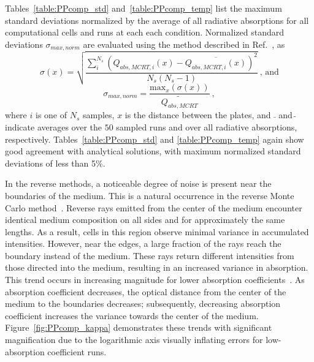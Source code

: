Tables~\ref{table:PPcomp_std} and~\ref{table:PPcomp_temp} list the maximum standard deviations normalized by the average of all radiative absorptions for all computational cells and runs at each each condition. Normalized standard deviations $\sigma_{max,norm}$ are evaluated using the method described in Ref.~\cite{Modest2022ChapterExchange}, as 
\begin{equation}
    \sigma(x) = \sqrt{\frac{\sum_i^{N_s}{(Q_{abs,MCRT,i}(x)-\overline{Q_{abs,MCRT,i}(x)})^2}}{N_s(N_s-1)}}~\text{, and}
    \label{eq:StandardDeviation}
\end{equation}
\begin{equation}
    \sigma_{max,norm} = \frac{\text{max}_x(\sigma(x))}{\widetilde{Q_{abs,MCRT}}}~,
    \label{eq:StandardDeviationMax}
\end{equation}
where $i$ is one of $N_s$ samples, $x$ is the distance between the plates, and $\bar{~}$ and $\widetilde{~}$ indicate averages over the $50$ sampled runs and over all radiative absorptions, respectively. 
Tables~\ref{table:PPcomp_std} and \ref{table:PPcomp_temp} again show good agreement with analytical solutions, with maximum normalized standard deviations of less than 5\%.

In the reverse methods, a noticeable degree of noise is present near the boundaries of the medium. This is a natural occurrence in the reverse Monte Carlo method~\cite{Farmer1998ComparisonMedia}. Reverse rays emitted from the center of the medium encounter identical medium composition on all sides and for approximately the same lengths. As a result, cells in this region observe minimal variance in accumulated intensities. However, near the edges, a large fraction of the rays reach the boundary instead of the medium. These rays return different intensities from those directed into the medium, resulting in an increased variance in absorption.
This trend occurs in increasing magnitude for lower absorption coefficients~\cite{Farmer1998ComparisonMedia}. As absorption coefficient decreases, the optical distance from the center of the medium to the boundaries decreases; subsequently, decreasing absorption coefficient increases the variance towards the center of the medium. Figure~\ref{fig:PPcomp_kappa} demonstrates these trends with significant magnification due to the logarithmic axis visually inflating errors for low-absorption coefficient runs.



